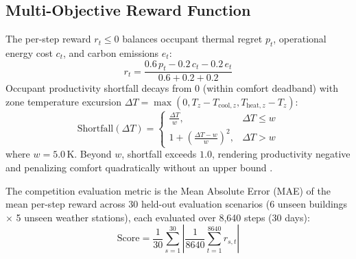 \documentclass{article}
\begin{document}
\subsection{Multi-Objective Reward Function}
The per-step reward $r_t \le 0$ balances occupant thermal regret $p_t$, operational energy cost $c_t$, and carbon emissions $e_t$:
\begin{equation}
r_t = \frac{0.6\, p_t - 0.2\, c_t - 0.2\, e_t}{0.6 + 0.2 + 0.2}
\end{equation}
Occupant productivity shortfall decays from $0$ (within comfort deadband) with zone temperature excursion $\Delta T = \max(0, T_z - T_{\text{cool}, z}, T_{\text{heat}, z} - T_z)$:
\begin{equation}
\text{Shortfall}(\Delta T) = \begin{cases} \frac{\Delta T}{w}, & \Delta T \le w \\ 1 + \left(\frac{\Delta T - w}{w}\right)^2, & \Delta T > w \end{cases}
\end{equation}
where $w = 5.0\,\text{K}$. Beyond $w$, shortfall exceeds $1.0$, rendering productivity negative and penalizing comfort quadratically without an upper bound \cite{goldfeder2024smart}.

The competition evaluation metric is the Mean Absolute Error (MAE) of the mean per-step reward across 30 held-out evaluation scenarios (6 unseen buildings $\times$ 5 unseen weather stations), each evaluated over 8,640 steps (30 days):
\begin{equation}
\text{Score} = \frac{1}{30} \sum_{s=1}^{30} \left| \frac{1}{8640} \sum_{t=1}^{8640} r_{s,t} \right|
\end{equation}
\end{document}
